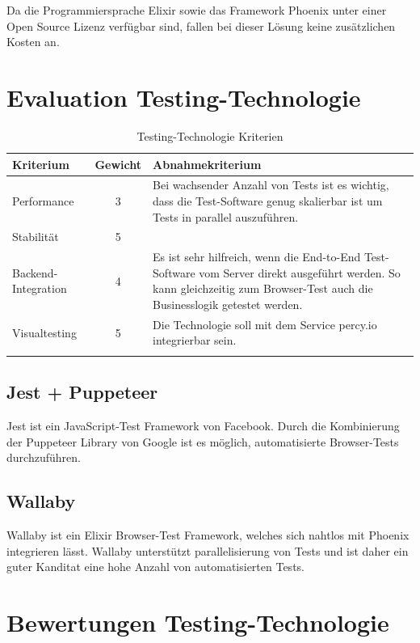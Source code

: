 Da die Programmiersprache Elixir sowie das Framework Phoenix unter einer
Open Source Lizenz verfügbar sind, fallen bei dieser Lösung keine zusätzlichen
Kosten an.

\clearpage
\section{Evaluation Testing-Technologie}\label{evaluation-testing-technologie}



\begin{longtable}[]{@{}p{2cm}cp{10cm}@{}}
  \toprule
  \textbf{Kriterium}  & \textbf{Gewicht} & \textbf{Abnahmekriterium}\tabularnewline
  \midrule
  \endhead
  Performance         & 3                & Bei wachsender Anzahl von Tests ist es wichtig, dass die Test-Software genug skalierbar ist um Tests in parallel auszuführen.\tabularnewline
  \midrule
  Stabilität          & 5                & \tabularnewline
  \midrule
  Backend-Integration & 4                & Es ist sehr hilfreich, wenn die End-to-End Test-Software vom Server direkt ausgeführt werden. So kann gleichzeitig zum Browser-Test auch die Businesslogik getestet werden.\tabularnewline
  \midrule
  Visualtesting       & 5                & Die Technologie soll mit dem Service percy.io integrierbar sein.\tabularnewline
  \bottomrule
  \caption{Testing-Technologie Kriterien}
\end{longtable}

\subsection{Jest + Puppeteer}

Jest ist ein JavaScript-Test Framework von Facebook. Durch die Kombinierung der
Puppeteer Library von Google ist es möglich, automatisierte Browser-Tests
durchzuführen.

\subsection{Wallaby}

Wallaby ist ein Elixir Browser-Test Framework, welches sich nahtlos mit Phoenix
integrieren lässt. Wallaby unterstützt parallelisierung von Tests und ist daher
ein guter Kanditat eine hohe Anzahl von automatisierten Tests.

\clearpage
\section{Bewertungen Testing-Technologie}\label{bewertungen-testing-technologie}

